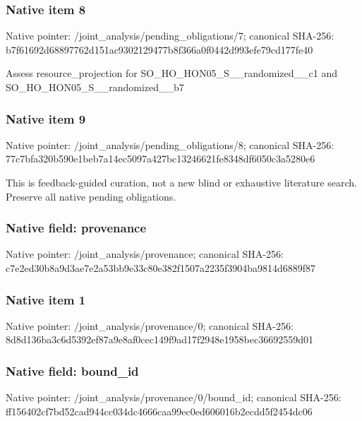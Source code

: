 \documentclass[10pt,a4paper]{article}
\begin{document}
\subsubsection{Native item 8}
Native pointer: /joint\_\allowbreak{}analysis/pending\_\allowbreak{}obligations/7; canonical SHA-256: b7f61692d68897762d151ac9302129477b8f366a0f0442d993efe79cd177fe40

\begingroup\raggedright\sloppy Assess resource\_\allowbreak{}projection for SO\_\allowbreak{}HO\_\allowbreak{}HON05\_\allowbreak{}S\_\allowbreak{}\_\allowbreak{}randomized\_\allowbreak{}\_\allowbreak{}c1 and SO\_\allowbreak{}HO\_\allowbreak{}HON05\_\allowbreak{}S\_\allowbreak{}\_\allowbreak{}randomized\_\allowbreak{}\_\allowbreak{}b7\par\endgroup

\subsubsection{Native item 9}
Native pointer: /joint\_\allowbreak{}analysis/pending\_\allowbreak{}obligations/8; canonical SHA-256: 77c7bfa320b590e1beb7a14ec5097a427bc13246621fe8348df6050c3a5280e6

\begingroup\raggedright\sloppy This is feedback-guided curation,\allowbreak{} not a new blind or exhaustive literature search. Preserve all native pending obligations.\par\endgroup

\subsubsection{Native field: provenance}
Native pointer: /joint\_\allowbreak{}analysis/provenance; canonical SHA-256: c7e2ed30b8a9d3ae7e2a53bb9e33c80e382f1507a2235f3904ba9814d6889f87

\subsubsection{Native item 1}
Native pointer: /joint\_\allowbreak{}analysis/provenance/0; canonical SHA-256: 8d8d136ba3c6d5392ef87a9e8af0cec149f9ad17f2948e1958bec36692559d01

\subsubsection{Native field: bound\_\allowbreak{}id}
Native pointer: /joint\_\allowbreak{}analysis/provenance/0/bound\_\allowbreak{}id; canonical SHA-256: ff156402cf7bd52cad944cc034dc4666caa99ec0ed606016b2ecdd5f2454dc06
\end{document}
